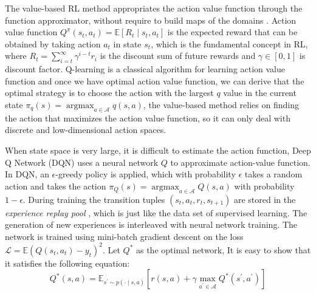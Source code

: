 \documentclass[journal]{IEEEtran}
\begin{document}
The value-based RL method appropriates the action value function through the function approximator, without require to build maps of the domains \cite{dearden1998bayesian}.
Action value function $Q^{\pi}\left(s_{t}, a_{t}\right)=\mathbb{E}\left[R_{t} \mid s_{t}, a_{t}\right]$ is the expected reward that can be obtained by taking action $a_t$ in state $s_t$, which is the fundamental concept in RL, where $R_{t}=\sum_{i=t}^{\infty} \gamma^{i-t} r_{i}$ is the discount sum of future rewards and $\gamma \in [0,1]$ is discount factor. Q-learning \cite{watkins1992q} is a classical algorithm for learning action value function and once we have optimal action value function, we can derive that the optimal strategy is to choose the action with the largest $q$ value in the current state $\pi_{q}(s)=\operatorname{argmax}_{a \in \mathcal{A}} q(s, a)$,
the value-based method relies on finding the action that maximizes the action value function, so it can only deal with discrete and low-dimensional action spaces.

When state space is very large, it is difficult to estimate the action function, Deep Q Network (DQN) \cite{mnih2015human} uses a neural network $Q$ to approximate action-value function.
In DQN, an $\epsilon$-greedy policy is applied, which with probability $\epsilon$ takes a random action and takes the action $\pi_{Q}(s)=\operatorname{argmax}_{a \in \mathcal{A}} Q(s, a)$ with probability $1-\epsilon$.
During training the transition tuples $(s_{t}, a_{t}, r_{t}, s_{t+1})$ are stored in the \textit{experience replay pool} \cite{her}, which is just like the data set of supervised learning. The generation of new experiences is interleaved with neural network training. The network is trained using mini-batch gradient descent on the loss $\mathcal{L}=\mathbb{E}\left(Q\left(s_{t}, a_{t}\right)-y_{t}\right)^{2}$.
Let $Q^*$ as the optimal network, It is easy to show that it satisfies the following equation:
\begin{equation}
  Q^{*}(s, a)=\mathbb{E}_{s^{\prime} \sim p(\cdot \mid s, a)}\left[r(s, a)+\gamma \max _{a^{\prime} \in \mathcal{A}} Q^{*}\left(s^{\prime}, a^{\prime}\right)\right]
  \label{eq:bellman}
\end{equation}
\end{document}
